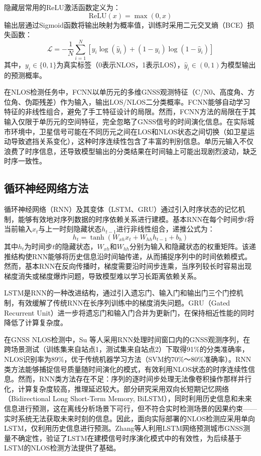     隐藏层常用的ReLU激活函数定义为：
    \begin{equation}
    \text{ReLU}(x) = \max(0, x)
    \end{equation}
    输出层通过Sigmoid函数将输出映射为概率值，训练时采用二元交叉熵（BCE）损失函数：
    \begin{equation}
    \mathcal{L} = -\frac{1}{N}\sum_{i=1}^{N}\left[y_i \log(\hat{y}_i) + (1 - y_i)\log(1 - \hat{y}_i)\right]
    \end{equation}
    其中，$y_i \in \{0, 1\}$为真实标签（0表示NLOS，1表示LOS），$\hat{y}_i \in (0, 1)$为模型输出的预测概率。

    在NLOS检测任务中，FCNN以单历元的多维GNSS观测特征（C/N0、高度角、方位角、伪距残差）作为输入，输出LOS/NLOS二分类概率。FCNN能够自动学习特征的非线性组合，避免了手工特征设计的局限。然而，FCNN方法的局限在于其输入仅限于单历元的空间特征，完全忽略了GNSS信号的时间演化信息。在实际城市环境中，卫星信号可能在不同历元之间在LOS和NLOS状态之间切换（如卫星运动导致遮挡关系变化），这种时序连续性包含了丰富的判别信息。单历元输入不仅浪费了时序信息，还导致模型输出的分类结果在时间轴上可能出现剧烈波动，缺乏时序一致性。

\subsection{循环神经网络方法}

    循环神经网络（RNN）及其变体（LSTM、GRU）通过引入时序状态的记忆机制，能够有效地对序列数据的时序依赖关系进行建模。基本RNN在每个时间步$t$将当前输入$x_t$与上一时刻隐藏状态$h_{t-1}$进行非线性组合，递推公式为：
    \begin{equation}
    h_t = \tanh(W_{xh} x_t + W_{hh} h_{t-1} + b_h)
    \end{equation}
    其中$h_t$为时间步$t$的隐藏状态，$W_{xh}$和$W_{hh}$分别为输入和隐藏状态的权重矩阵。该递推结构使RNN能够将历史信息沿时间轴传递，从而捕捉序列中的时间依赖模式。然而，基本RNN在反向传播时，梯度需要沿时间步连乘，当序列较长时容易出现梯度消失或梯度爆炸问题，导致模型难以学习长距离依赖关系。

    LSTM是RNN的一种改进结构，通过引入遗忘门、输入门和输出门三个门控机制，有效缓解了传统RNN在长序列训练中的梯度消失问题。GRU（Gated Recurrent Unit）进一步将遗忘门和输入门合并为更新门，在保持相近性能的同时降低了计算复杂度。

    在GNSS NLOS检测中，Su 等人\cite{su2022nlos}采用RNN处理时间窗口内的GNSS观测序列，在跨场景测试（训练集来自站点1，测试集来自站点2）下取得91\%的分类准确率，NLOS识别率为89\%，优于传统机器学习方法（SVM约70\%～80\%准确率）。RNN类方法能够捕捉信号质量随时间演化的模式，有效利用NLOS状态的时序连续性信息。然而，RNN类方法存在不足：序列的逐时间步处理无法像卷积操作那样并行化，计算复杂度较高，推理延迟较大。部分研究采用双向长短期记忆网络（Bidirectional Long Short-Term Memory, BiLSTM），同时利用历史信息和未来信息进行预测，这在离线分析场景下可行，但不符合实时检测场景的因果约束——实时系统无法获取未来时刻的信息。因此，面向实际部署的NLOS检测应采用单向LSTM，仅利用历史信息进行预测。Zhang等人\cite{zhang2021lstm}利用LSTM网络预测城市GNSS测量不确定性，验证了LSTM在建模信号时序演化模式中的有效性，为后续基于LSTM的NLOS检测方法提供了基础。

